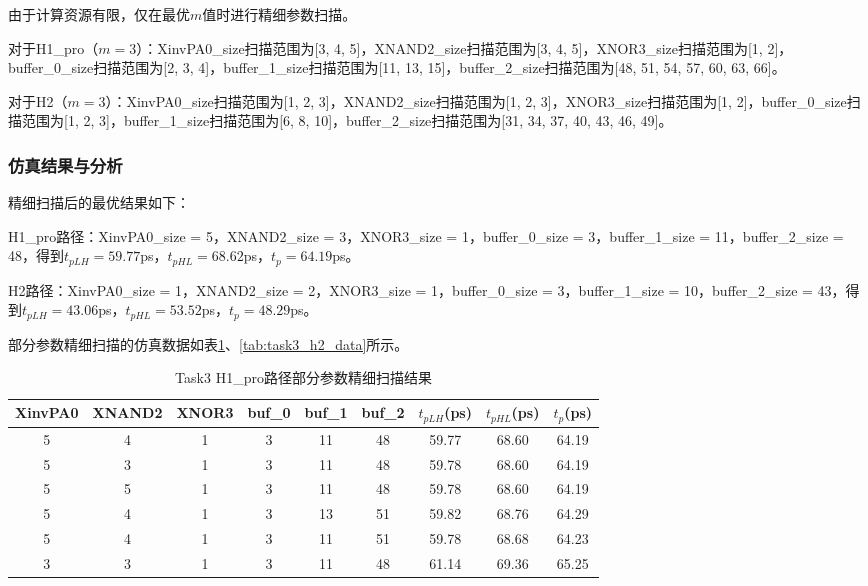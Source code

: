 \documentclass[UTF8,12pt,a4paper]{ctexart}
\begin{document}
由于计算资源有限，仅在最优$m$值时进行精细参数扫描。

对于H1\_pro（$m = 3$）：XinvPA0\_size扫描范围为[3, 4, 5]，XNAND2\_size扫描范围为[3, 4, 5]，XNOR3\_size扫描范围为[1, 2]，buffer\_0\_size扫描范围为[2, 3, 4]，buffer\_1\_size扫描范围为[11, 13, 15]，buffer\_2\_size扫描范围为[48, 51, 54, 57, 60, 63, 66]。

对于H2（$m = 3$）：XinvPA0\_size扫描范围为[1, 2, 3]，XNAND2\_size扫描范围为[1, 2, 3]，XNOR3\_size扫描范围为[1, 2]，buffer\_0\_size扫描范围为[1, 2, 3]，buffer\_1\_size扫描范围为[6, 8, 10]，buffer\_2\_size扫描范围为[31, 34, 37, 40, 43, 46, 49]。

\subsubsection{仿真结果与分析}

精细扫描后的最优结果如下：

H1\_pro路径：XinvPA0\_size = 5，XNAND2\_size = 3，XNOR3\_size = 1，buffer\_0\_size = 3，buffer\_1\_size = 11，buffer\_2\_size = 48，得到$t_{pLH} = 59.77$ps，$t_{pHL} = 68.62$ps，$t_p = 64.19$ps。

H2路径：XinvPA0\_size = 1，XNAND2\_size = 2，XNOR3\_size = 1，buffer\_0\_size = 3，buffer\_1\_size = 10，buffer\_2\_size = 43，得到$t_{pLH} = 43.06$ps，$t_{pHL} = 53.52$ps，$t_p = 48.29$ps。

部分参数精细扫描的仿真数据如表\ref{tab:task3_h1pro_data}、\ref{tab:task3_h2_data}所示。

\begin{table}[htbp]
\centering
\caption{Task3 H1\_pro路径部分参数精细扫描结果}
\label{tab:task3_h1pro_data}
\begin{tabular}{|c|c|c|c|c|c|c|c|c|}
\hline
XinvPA0 & XNAND2 & XNOR3 & buf\_0 & buf\_1 & buf\_2 & $t_{pLH}$(ps) & $t_{pHL}$(ps) & $t_p$(ps) \\
\hline
5 & 4 & 1 & 3 & 11 & 48 & 59.77 & 68.60 & 64.19 \\
5 & 3 & 1 & 3 & 11 & 48 & 59.78 & 68.60 & 64.19 \\
5 & 5 & 1 & 3 & 11 & 48 & 59.78 & 68.60 & 64.19 \\
5 & 4 & 1 & 3 & 13 & 51 & 59.82 & 68.76 & 64.29 \\
5 & 4 & 1 & 3 & 11 & 51 & 59.78 & 68.68 & 64.23 \\
3 & 3 & 1 & 3 & 11 & 48 & 61.14 & 69.36 & 65.25 \\
\hline
\end{tabular}
\end{table}
\end{document}
